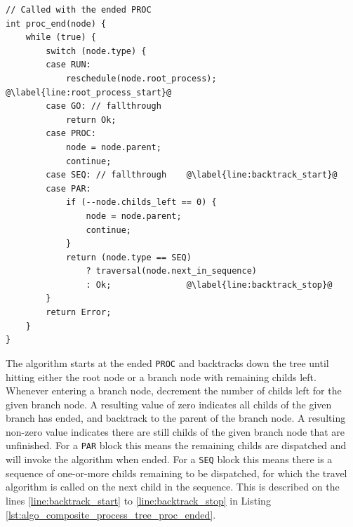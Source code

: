 
\begin{lstlisting}[style=CustomC,caption={Pseudo code for the composite process tree \texttt{PROC} ended algorithm},label={lst:algo_composite_process_tree_proc_ended}]
// Called with the ended PROC
int proc_end(node) {
	while (true) {
		switch (node.type) {
		case RUN:                           
			reschedule(node.root_process);  @\label{line:root_process_start}@
		case GO: // fallthrough
			return Ok;
		case PROC:
			node = node.parent;
			continue;
		case SEQ: // fallthrough    @\label{line:backtrack_start}@
		case PAR:
			if (--node.childs_left == 0) {
				node = node.parent;
				continue;
			}
			return (node.type == SEQ)
				? traversal(node.next_in_sequence)
				: Ok;               @\label{line:backtrack_stop}@
		}
		return Error;
	}
}
\end{lstlisting}

The algorithm starts at the ended \texttt{PROC} and backtracks down the tree until hitting either the root node or a branch node with remaining childs left. Whenever entering a branch node, decrement the number of childs left for the given branch node. A resulting value of zero indicates all childs of the given branch has ended, and backtrack to the parent of the branch node. A resulting non\hyp{}zero value indicates there are still childs of the given branch node that are unfinished. For a \texttt{PAR} block this means the remaining childs are dispatched and will invoke the algorithm when ended. For a \texttt{SEQ} block this means there is a sequence of one\hyp{}or\hyp{}more childs remaining to be dispatched, for which the travel algorithm is called on the next child in the sequence. This is described on the lines \ref{line:backtrack_start} to \ref{line:backtrack_stop} in Listing \ref{lst:algo_composite_process_tree_proc_ended}.

